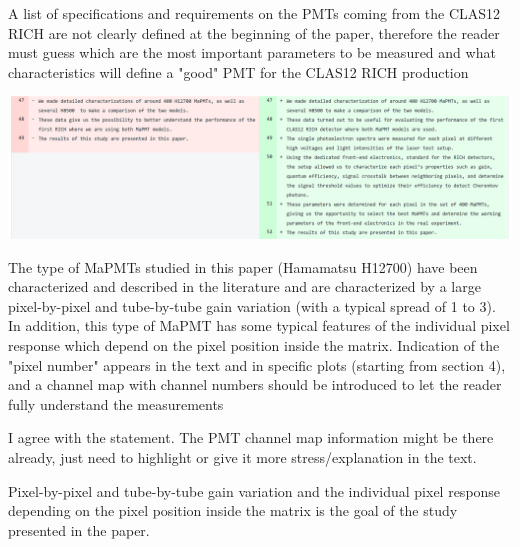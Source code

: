 \documentclass[11pt]{report}
\begin{document}
\begin{tcolorbox}[enlarge top by=2em,colbacktitle=red!60!white,colframe=black!80!white,left=0pt,right=0pt,top=0pt,bottom=0pt,boxrule=0.3pt,title=\bfseries2.02]
A list of specifications and requirements on the PMTs coming from the CLAS12 RICH are not clearly defined at the beginning of the paper, therefore the reader must guess which are the most important parameters to be measured and what characteristics will define a "good" PMT for the CLAS12 RICH production
\end{tcolorbox}

\includegraphics[width=\linewidth]{round1/2.02.png}


\begin{tcolorbox}[enlarge top by=2em,colbacktitle=red!60!white,colframe=black!80!white,left=0pt,right=0pt,top=0pt,bottom=0pt,boxrule=0.3pt,title=\bfseries2.03]
The type of MaPMTs studied in this paper (Hamamatsu H12700) have been characterized and described in the literature and are characterized by a large pixel-by-pixel and tube-by-tube gain variation (with a typical spread of 1 to 3). In addition, this type of MaPMT has some typical features of the individual pixel response which depend on the pixel position inside the matrix. Indication of the "pixel number" appears in the text and in specific plots (starting from section 4), and a channel map with channel numbers should be introduced to let the reader fully understand the measurements
\end{tcolorbox}

{\centering
\begin{tcolorbox}[enlarge top by=2em,colbacktitle=green!60!white,colframe=black!80!white,width=0.9\linewidth,left=30pt,right=30pt,top=10pt,bottom=10pt,boxrule=0.3pt,title=\bfseries our draft remarks]
I agree with the statement. The PMT channel map information might be there already, just need to highlight or give it more stress/explanation in the text.

Pixel-by-pixel and tube-by-tube gain variation and the individual pixel response 
depending on the pixel position inside the matrix is the goal of the study presented in the paper.

\end{tcolorbox}
}
\end{document}
